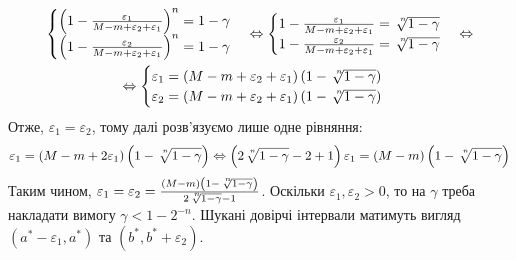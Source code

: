 \begin{gather*}
    \begin{cases}
        \left(1 - \frac{\varepsilon_1}{M - m + \varepsilon_2 + \varepsilon_1}\right)^n = 1 - \gamma \\
        \left(1 - \frac{\varepsilon_2}{M - m + \varepsilon_2 + \varepsilon_1}\right)^n = 1 - \gamma
    \end{cases} \Leftrightarrow
    \begin{cases}
        1 - \frac{\varepsilon_1}{M - m + \varepsilon_2 + \varepsilon_1} = \sqrt[\leftroot{-3}\uproot{3}n]{1-\gamma} \\
        1 - \frac{\varepsilon_2}{M - m + \varepsilon_2 + \varepsilon_1} = \sqrt[\leftroot{-3}\uproot{3}n]{1-\gamma}
    \end{cases} \Leftrightarrow \\
    \Leftrightarrow
    \begin{cases}
        \varepsilon_1 = \left(M - m + \varepsilon_2 + \varepsilon_1\right)\left(1 - \sqrt[\leftroot{-3}\uproot{3}n]{1-\gamma}\right) \\
        \varepsilon_2 = \left(M - m + \varepsilon_2 + \varepsilon_1\right)\left(1 - \sqrt[\leftroot{-3}\uproot{3}n]{1-\gamma}\right)
    \end{cases}
\end{gather*}
Отже, $\varepsilon_1 = \varepsilon_2$, тому далі розв'язуємо лише одне рівняння:
\begin{gather*}
    \varepsilon_1 = \left(M - m + 2\varepsilon_1\right) \left(1 - \sqrt[\leftroot{-3}\uproot{3}n]{1-\gamma}\right) \Leftrightarrow
    \left( 2\sqrt[\leftroot{-3}\uproot{3}n]{1-\gamma} - 2 + 1\right)\varepsilon_1 = \left(M - m\right)\left(1 - \sqrt[\leftroot{-3}\uproot{3}n]{1-\gamma}\right)
\end{gather*}
Таким чином, $\varepsilon_1 = \varepsilon_2 = \frac{\left(M - m\right)\left(1 - \sqrt[\leftroot{-3}\uproot{3}n]{1-\gamma}\right)}{2\sqrt[\leftroot{-3}\uproot{3}n]{1-\gamma} - 1}$.
Оскільки $\varepsilon_1, \varepsilon_2 > 0$, то на $\gamma$ треба накладати вимогу $\gamma < 1 - 2^{-n}$.
Шукані довірчі інтервали матимуть вигляд $\left(a^* - \varepsilon_1, a^*\right)$ та $\left(b^*, b^* + \varepsilon_2\right)$.